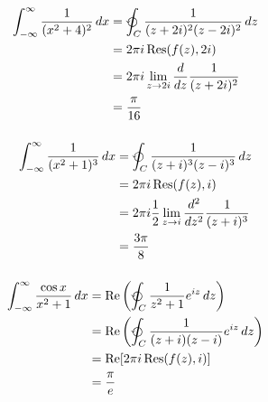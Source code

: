 \documentclass{article}
\renewcommand{\Re}{\operatorname{Re}}
\newcommand{\Res}{\operatorname{Res}}
\begin{document}
\begin{align*}
  \int_{-\infty}^\infty \frac{1}{(x^2 + 4)^2} \,d x & = \varointctrclockwise_C \frac{1}{(z + 2 i)^2 (z - 2 i)^2} \,d z       \\
                                                    & = 2 \pi i \Res(f(z), 2 i)                                              \\
                                                    & = 2 \pi i \lim_{z \rightarrow 2 i} \frac{d}{d z} \frac{1}{(z + 2 i)^2} \\
                                                    & = \frac{\pi}{16}
\end{align*}

\setcounter{subsubsection}{14}
\subsubsection{}

\begin{align*}
  \int_{-\infty}^\infty \frac{1}{(x^2 + 1)^3} \,d x & = \varointctrclockwise_C \frac{1}{(z + i)^3 (z - i)^3} \,d z                       \\
                                                    & = 2 \pi i \Res(f(z), i)                                                            \\
                                                    & = 2 \pi i \frac{1}{2} \lim_{z \rightarrow i} \frac{d^2}{d z^2} \frac{1}{(z + i)^3} \\
                                                    & = \frac{3 \pi}{8}
\end{align*}

\setcounter{subsubsection}{20}
\subsubsection{}

\begin{align*}
  \int_{-\infty}^\infty \frac{\cos x}{x^2 + 1} \,d x & = \Re \left( \varointctrclockwise_C \frac{1}{z^2 + 1} e^{i z} \,d z \right)         \\
                                                     & = \Re \left( \varointctrclockwise_C \frac{1}{(z + i) (z - i)} e^{i z} \,d z \right) \\
                                                     & = \Re [2 \pi i \Res(f(z), i)]                                                       \\
                                                     & = \frac{\pi}{e}
\end{align*}
\end{document}
